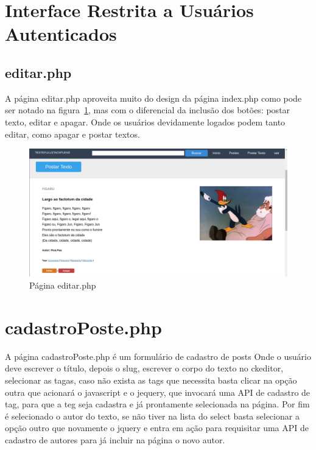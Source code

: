 \documentclass[
	article,			%
	11pt,				%
	oneside,			%
	a4paper,			%
	english,			%
	brazil,				%
	sumario=tradicional
	]{abntex2}
\begin{document}
\section{Interface Restrita a Usuários Autenticados}

\subsection{editar.php}
A página editar.php aproveita muito do design da página index.php como pode ser notado na figura~\ref{editar}, mas com o diferencial da inclusão dos botões: postar texto, editar e apagar. Onde os usuários devidamente logados podem tanto editar, como apagar e postar textos.  

\begin{figure} [h!]
  \centering
    \caption{Página editar.php}
  \label{editar}
    \includegraphics[scale=0.3]{editar.png}
       
\end{figure} 

\section{cadastroPoste.php}

A página cadastroPoste.php é um formulário de cadastro de posts Onde o usuário deve escrever o título, depois o slug, escrever o corpo do texto no ckeditor, selecionar as tagas, caso não exista as tags que necessita basta clicar na opção outra que acionará o javascript e o jequery, que invocará uma API de cadastro de tag, para que a teg seja cadastra e já prontamente selecionada na página. Por fim é selecionado o autor do texto, se não tiver na lista do select basta selecionar a opção outro que novamente o jquery e entra em ação para requisitar uma API de cadastro de autores para já incluir na página o novo autor.  
\end{document}
